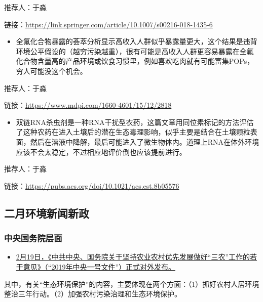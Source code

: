 \documentclass[]{book}
\providecommand{\tightlist}{%
  \setlength{\itemsep}{0pt}\setlength{\parskip}{0pt}}
\begin{document}
推荐人：于淼

链接：\url{https://link.springer.com/article/10.1007/s00216-018-1435-6}

\begin{itemize}
\tightlist
\item
  全氟化合物暴露的荟萃分析显示高收入人群似乎暴露量更大，这个结果是违背环境公平假设的（越穷污染越重），很有可能是高收入人群更容易暴露在全氟化合物含量高的产品环境或饮食习惯里，例如喜欢吃肉就有可能富集POPs，穷人可能没这个机会。
\end{itemize}

推荐人：于淼

链接：\url{https://www.mdpi.com/1660-4601/15/12/2818}

\begin{itemize}
\tightlist
\item
  双链RNA杀虫剂是一种RNA干扰型农药，这篇文章用同位素标记的方法评估了这种农药在进入土壤后的潜在生态毒理影响，似乎主要是结合在土壤颗粒表面，然后在溶液中降解，最后可能进入了微生物体内。道理上RNA在体外环境应该不会太稳定，不过相应地评价倒也应该提前进行。
\end{itemize}

推荐人：于淼

链接：\url{https://pubs.acs.org/doi/10.1021/acs.est.8b05576}

\hypertarget{ux4e8cux6708ux73afux5883ux65b0ux95fbux65b0ux653f}{%
\subsection*{二月环境新闻新政}\label{ux4e8cux6708ux73afux5883ux65b0ux95fbux65b0ux653f}}

\hypertarget{ux4e2dux592eux56fdux52a1ux9662ux5c42ux9762}{%
\subsubsection*{中央国务院层面}\label{ux4e2dux592eux56fdux52a1ux9662ux5c42ux9762}}

\begin{itemize}
\tightlist
\item
  \href{http://www.moa.gov.cn/xw/zwdt/201902/t20190219_6172153.htm}{2月19日，《中共中央、国务院关于坚持农业农村优先发展做好``三农''工作的若干意见》（``2019年中央一号文件''）正式对外发布。}
\end{itemize}

其中，有关``生态环境保护''的内容，主要体现在两个方面：（1）抓好农村人居环境整治三年行动。（2）加强农村污染治理和生态环境保护。
\end{document}
